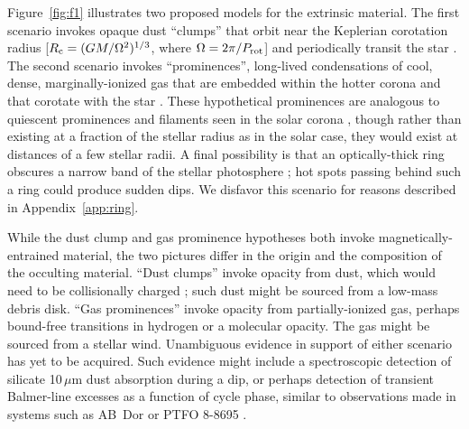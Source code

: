 \documentclass[11pt,twocolumn,tighten]{aastex63}
\begin{document}
Figure~\ref{fig:f1} illustrates two proposed models for the extrinsic
material.  The first scenario invokes opaque dust ``clumps'' that
orbit near the Keplerian corotation radius [$R_{\rm c} =
(GM/\Omega^2)^{1/3}$, where $\Omega = 2\pi/P_{\rm rot}$] and
periodically transit the star
\citep[e.g.][]{2017AJ....153..152S,2017MNRAS.471L.145F,2023MNRAS.518.4734S}.
The second scenario invokes ``prominences'', long-lived condensations
of cool, dense, marginally-ionized gas that are embedded within the
hotter corona and that corotate with the star
\citep{1989MNRAS.238..657C,2019MNRAS.482.2853J,2022MNRAS.514.5465W}.
These hypothetical prominences are analogous to quiescent prominences
and filaments seen in the solar corona \citep[see
e.g.][]{2015ASSL..415.....V}, though rather than existing at a
fraction of the stellar radius as in the solar case, they would exist
at distances of a few stellar radii.  A final possibility is that an
optically-thick ring obscures a narrow band of the stellar photosphere
\citep{2019ApJ...876..127Z}; hot spots passing behind such a ring
could produce sudden dips.  We disfavor this scenario for reasons
described in Appendix~\ref{app:ring}.

While the dust clump and gas prominence hypotheses both invoke
magnetically-entrained material, the two pictures differ in the origin
and the composition of the occulting material.   ``Dust clumps''
invoke opacity from dust, which would need to be collisionally charged
\citep{2023MNRAS.518.4734S}; such dust might be sourced from a
low-mass debris disk.  ``Gas prominences'' invoke opacity from
partially-ionized gas, perhaps bound-free transitions in hydrogen or a
molecular opacity.  The gas might be sourced from a stellar wind.
Unambiguous evidence in support of either scenario has yet to be
acquired.  Such evidence might include a spectroscopic detection of
silicate 10\,$\mu$m dust absorption during a dip, or perhaps detection
of transient Balmer-line excesses as a function of cycle phase,
similar to observations made in systems such as AB~Dor
\citep[see][]{1999ASPC..158..146C} or PTFO 8-8695
\citep{2016ApJ...830...15J}.
\end{document}
